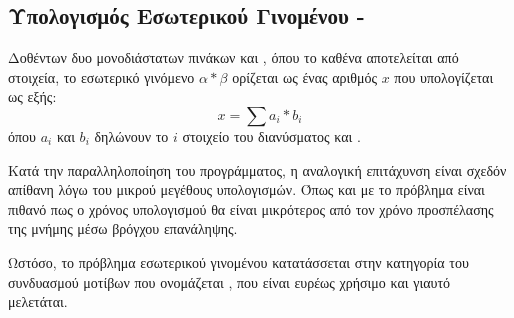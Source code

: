 \clearpage
{}

\subsection{Υπολογισμός Εσωτερικού Γινομένου - \emph{}}
Δοθέντων δυο μονοδιάστατων πινάκων \textbf{} και \textbf{}, όπου το καθένα αποτελείται από \textbf{} στοιχεία, το εσωτερικό γινόμενο $α * β$ ορίζεται ως ένας αριθμός $x$ που υπολογίζεται ως εξής:
$$x = \sum a_i * b_i$$
όπου  $a_i$ και $b_i$ δηλώνουν το $i$ στοιχείο του διανύσματος \textbf{} και \textbf{}.

Κατά την παραλληλοποίηση του προγράμματος, η αναλογική επιτάχυνση είναι σχεδόν απίθανη λόγω του μικρού μεγέθους υπολογισμών. Όπως και με το πρόβλημα  είναι πιθανό πως ο χρόνος υπολογισμού θα είναι μικρότερος από τον χρόνο προσπέλασης της μνήμης μέσω βρόγχου επανάληψης.

Ωστόσο, το πρόβλημα εσωτερικού γινομένου κατατάσσεται στην κατηγορία του συνδυασμού μοτίβων που ονομάζεται , που είναι ευρέως χρήσιμο και γιαυτό μελετάται.
\clearpage

